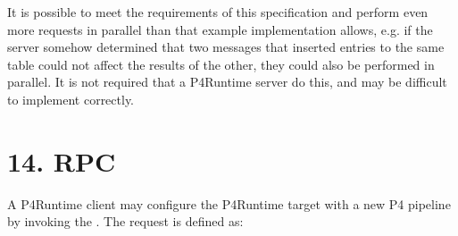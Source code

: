 \documentclass[11pt]{article}
\begin{document}
{%
It is possible to meet the requirements of this specification and
perform even more requests in parallel than that example
implementation allows, e.g. if the server somehow determined that two
 messages that inserted entries to the same table could
not affect the results of the other, they could also be performed in
parallel.  It is not required that a P4Runtime server do this, and may
be difficult to implement correctly.%

\section{14.\hspace*{0.5em} RPC}\label{sec-setforwardingpipelineconfig-rpc}%

\noindent{}A P4Runtime client may configure the P4Runtime target with a new P4 pipeline by
invoking the . The request is defined as:%

}
\end{document}
